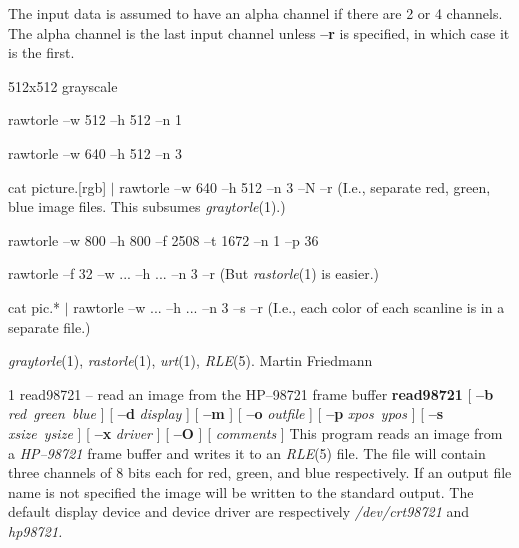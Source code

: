 The input data is assumed to have an alpha channel if there are 2 or 4
channels.  The alpha channel is the last input channel unless
{\bf --r}
is specified, in which case it is the first.
\begin{TPlist}{512x512 grayscale}
\item[{512x512 grayscale}]
rawtorle --w 512 --h 512 --n 1
\item[{640x512 raw RGB}]
rawtorle --w 640 --h 512 --n 3
\item[{picture.[rgb]}]
cat picture.[rgb] $|$ rawtorle --w 640 --h 512 --n 3 --N --r
\nwl
(I.e., separate red, green, blue image files.  This subsumes 
{\it graytorle}{\rm (1).)}
\item[{JPL ODL Voyager pics}]
rawtorle --w 800 --h 800 --f 2508 --t 1672 --n 1 --p 36
\item[{24bit Sun raster file}]
rawtorle --f 32 --w ... --h ... --n 3 --r
\nwl
(But 
{\it rastorle}{\rm (1)}
is easier.)
\item[{pic.\{000-100\}.[rgb]}]
cat pic.* $|$ rawtorle --w ... --h ... --n 3 --s --r
\nwl
(I.e., each color of each scanline is in a separate file.)
\end{TPlist}
{\it graytorle}{\rm (1),}
{\it rastorle}{\rm (1),}
{\it urt}{\rm (1),}
{\it RLE}{\rm (5).}
Martin Friedmann
\newpage


%
%
%
 1
read98721 -- read an image from the HP--98721 frame buffer
{\bf read98721}
[
{\bf --b}
{\it red\ green\ blue}
] [
{\bf --d}
{\it display}
] [
{\bf --m}
] [
{\bf --o}
{\it outfile}
] [
{\bf --p}
{\it xpos\ ypos}
] [
{\bf --s}
{\it xsize\ ysize}
] [
{\bf --x}
{\it driver}
] [
{\bf --O}
] [
{\it comments}
]
This program reads an image from a
{\it HP--98721}
frame buffer and writes it to an
{\it RLE}{\rm (5)}
file. The file will contain three channels of 8 bits each for red, green,
and blue respectively. If an output file name is not specified the image
will be written to the standard output.  The default display device
and device driver are respectively
{\it /dev/crt98721}
and
{\it hp98721.}

